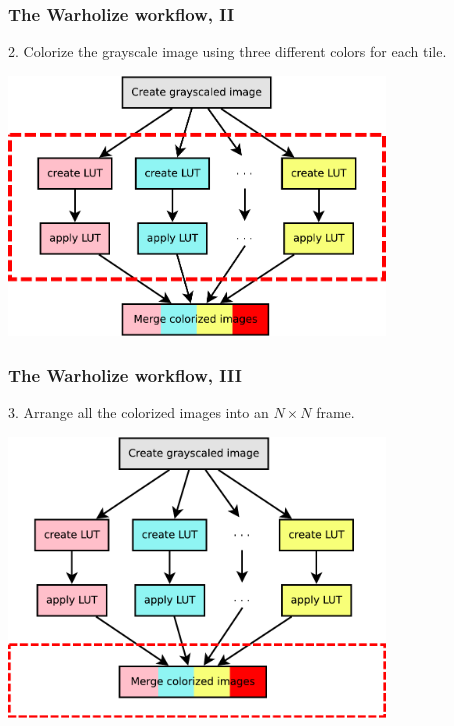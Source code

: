 \documentclass[english,serif,mathserif,usenames,dvipsnames]{beamer}
\begin{document}
\begin{frame}
  \frametitle{The Warholize workflow, II}

  2. Colorize the grayscale image using three different colors for each tile.

  \+
  \includegraphics[width=0.75\textwidth]{fig/warholize-wkf2}
\end{frame}


\begin{frame}
  \frametitle{The Warholize workflow, III}

  3. Arrange all the colorized images into an $N\times N$ frame.

  \+
  \includegraphics[width=0.75\textwidth]{fig/warholize-wkf3}
\end{frame}
\end{document}
